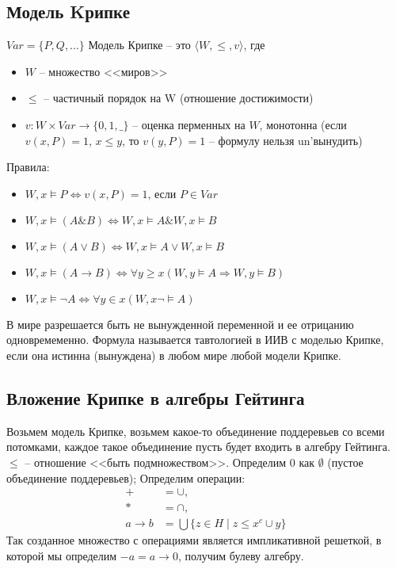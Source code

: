 \subsection{Модель Kрипке}
\label{sec-2-11}
$Var = \{P, Q, \dotsc\}$
Модель Крипке – это $\langle W, \leq, v\rangle$, где
\begin{itemize}
\item $W$ -- множество <<миров>>
\item $\leq$ -- частичный порядок на W (отношение достижимости)
\item $v \colon W \times Var \to \{0, 1, \_\}$ -- оценка перменных на $W$, монотонна
(если $v(x, P) = 1$, $x \leq y$, то $v(y, P) = 1$ -- формулу нельзя un'вынудить)
\end{itemize}

Правила:
\begin{itemize}
    \item $W, x \vDash  P \Leftrightarrow v(x, P) = 1 \text{, если $P \in Var$}$
\item $W, x \vDash  (A \& B) \Leftrightarrow W, x \vDash  A \& W, x \vDash  B$
\item $W, x \vDash  (A \lor B) \Leftrightarrow W, x \vDash  A \lor W, x \vDash  B$
\item $W, x \vDash  (A \to B) \Leftrightarrow \forall  y \ge x (W, y \vDash  A ⇒ W, y \vDash  B)$
\item $W, x \vDash  \lnot A \Leftrightarrow \forall  y \in x (W, x \lnot \vDash  A)$
\end{itemize}

В мире разрешается быть не вынужденной переменной и ее отрицанию
одновремеменно.
Формула называется тавтологией в ИИВ с моделью Крипке, если она
истинна (вынуждена) в любом мире любой модели Крипке.
\subsection{Вложение Крипке в алгебры Гейтинга}
\label{sec-2-12}
Возьмем модель Крипке, возьмем какое-то объединение поддеревьев
со всеми потомками, каждое такое объединение пусть будет входить
в алгебру Гейтинга. $\le$ -- отношение <<быть подмножеством>>.
Определим $0$ как $\emptyset$ (пустое объединение поддеревьев);
Определим операции:
\begin{align*}
    + &= \cup,\\
    * &= \cap,\\
    a \to b &= \bigcup \{z \in H \mid z \le x^c \cup  y\}
\end{align*}
Так созданное множество с операциями является импликативной
решеткой, в которой мы определим $-a = a \to 0$, получим булеву алгебру.
